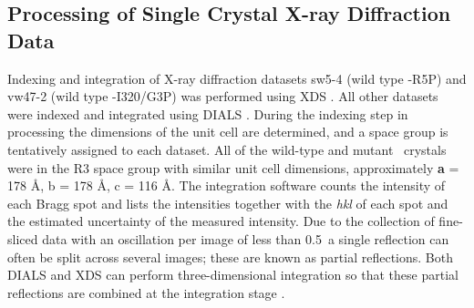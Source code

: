 \newpage
\subsection{Processing of Single Crystal X-ray Diffraction Data}

Indexing and integration of X-ray diffraction datasets sw5-4 (wild type \atpdx -R5P) and vw47-2 (wild type \atpdx -I320/G3P) was performed using XDS \cite{Kabsch2010}. All other datasets were indexed and integrated using DIALS \cite{Waterman2013}. During the indexing step in processing the dimensions of the unit cell are determined, and a space group is tentatively assigned to each dataset. All of the wild-type and mutant \atpdx ~crystals were in the R3 space group with similar unit cell dimensions, approximately \textbf{a} = 178 \si{\angstrom}, b = 178 \si{\angstrom}, c = 116 \si{\angstrom}. The integration software counts the intensity of each Bragg spot and lists the intensities together with the \textit{hkl} of each spot and the estimated uncertainty of the measured intensity. Due to the collection of fine-sliced data with an oscillation per image of less than 0.5\degree ~a single reflection can often be split across several images; these are known as partial reflections. Both DIALS and XDS can perform three-dimensional integration so that these partial reflections are combined at the integration stage \cite{Kabsch2010,Waterman2013}.  

